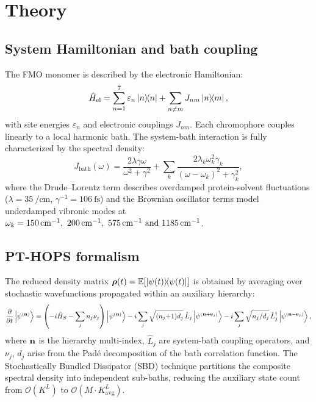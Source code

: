 \documentclass[aip,jcp,preprint]{revtex4-2}
\begin{document}
\section{\label{sec:theory}Theory}

\subsection{System Hamiltonian and bath coupling}
The FMO monomer is described by the electronic Hamiltonian:\cite{Adolphs2006}
\begin{equation}
\hat{H}_{\mathrm{el}} = \sum_{n=1}^{7} \varepsilon_n \dyad{n} + \sum_{n \neq m} J_{nm} \dyad{n}{m},
\end{equation}
with site energies $\varepsilon_n$ and electronic couplings $J_{nm}$. Each chromophore couples linearly to a local harmonic bath. The system-bath interaction is fully characterized by the spectral density:\cite{Moix2011}
\begin{equation}
J_{\mathrm{bath}}(\omega) = \frac{2\lambda\gamma\omega}{\omega^2 + \gamma^2} + \sum_k \frac{2\lambda_k\omega_k^2\gamma_k}{(\omega-\omega_k)^2 + \gamma_k^2},
\label{eq:spectral_density}
\end{equation}
where the Drude--Lorentz term describes overdamped protein-solvent fluctuations ($\lambda = \SI{35}{\per\centi\meter}$, $\gamma^{-1} = \SI{106}{\femto\second}$) and the Brownian oscillator terms model underdamped vibronic modes at $\omega_k = \SIlist{150;200;575;1185}{\per\centi\meter}$.\cite{Chin2013}

\subsection{PT-HOPS formalism}
The reduced density matrix $\vb*{\rho}(t) = \mathbb{E}[\dyad{\psi(t)}]$ is obtained by averaging over stochastic wavefunctions propagated within an auxiliary hierarchy:\cite{Suess2014,Citty2024a}
\begin{equation}
\pdv{t}\ket{\psi^{(\vb{n})}} = \left(-i\hat{H}_S - \sum_{j} n_j \nu_j\right)\ket{\psi^{(\vb{n})}}
- i\sum_{j} \sqrt{(n_j{+}1)d_j}\,\hat{L}_j \ket{\psi^{(\vb{n}+\vb{e}_j)}}
- i\sum_{j} \sqrt{n_j/d_j}\,\hat{L}_j^\dagger \ket{\psi^{(\vb{n}-\vb{e}_j)}},
\label{eq:hops}
\end{equation}
where $\vb{n}$ is the hierarchy multi-index, $\hat{L}_j$ are system-bath coupling operators, and $\nu_j$, $d_j$ arise from the Padé decomposition of the bath correlation function.\cite{Duan2017} The Stochastically Bundled Dissipator (SBD) technique partitions the composite spectral density into independent sub-baths, reducing the auxiliary state count from $\mathcal{O}(K^L)$ to $\mathcal{O}(M \cdot K_{\mathrm{avg}}^L)$.\cite{Citty2024a}
\end{document}

